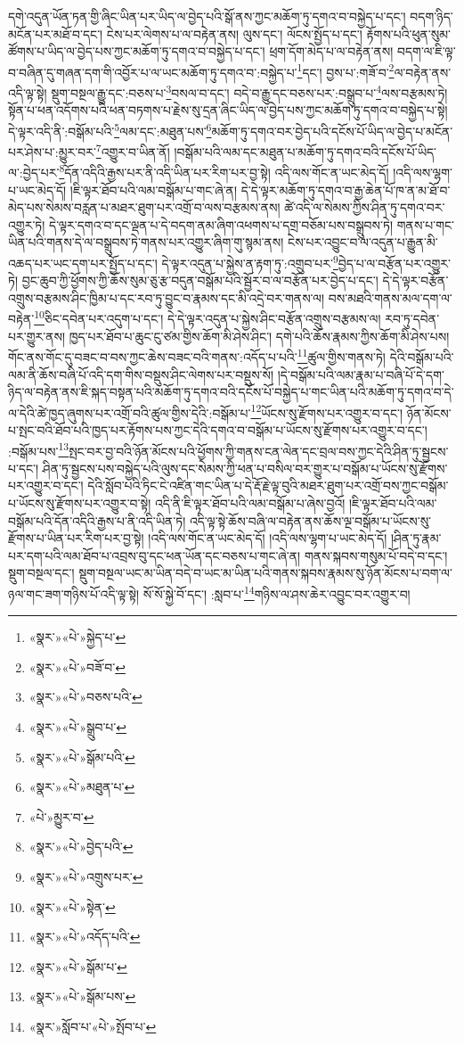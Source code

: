 དགེ་འདུན་ཡོན་ཏན་གྱི་ཞིང་ཡིན་པར་ཡིད་ལ་བྱེད་པའི་སྒོ་ནས་ཀྱང་མཆོག་ཏུ་དགའ་བ་བསྐྱེད་པ་དང་། བདག་ཉིད་མངོན་པར་མཐོ་བ་དང་། ངེས་པར་ལེགས་པ་ལ་བརྟེན་ནས། ལུས་དང་། ལོངས་སྤྱོད་པ་དང་། རྟོགས་པའི་ཕུན་སུམ་ཚོགས་པ་ཡིད་ལ་བྱེད་པས་ཀྱང་མཆོག་ཏུ་དགའ་བ་བསྐྱེད་པ་དང་། ཕྲག་དོག་མེད་པ་ལ་བརྟེན་ནས། བདག་ལ་ཇི་ལྟ་བ་བཞིན་དུ་གཞན་དག་གི་འབྱོར་པ་ལ་ཡང་མཆོག་ཏུ་དགའ་བ་:བསྐྱེད་པ་\footnote{«སྣར་»«པེ་»སྐྱེད་པ་}དང་། བྱས་པ་:གཟོ་བ་\footnote{«སྣར་»«པེ་»བཟོ་བ་}ལ་བརྟེན་ནས་འདི་ལྟ་སྟེ། སྡུག་བསྔལ་རྒྱུ་དང་:བཅས་པ་\footnote{«སྣར་»«པེ་»བཅས་པའི་}བསལ་བ་དང་། བདེ་བ་རྒྱུ་དང་བཅས་པར་:བསྒྲུབ་པ་\footnote{«སྣར་»«པེ་»སྒྲུབ་པ་}ལས་བརྩམས་ཏེ། སྟོན་པ་ཕན་འདོགས་པའི་ཕན་བཏགས་པ་རྗེས་སུ་དྲན་ཞིང་ཡིད་ལ་བྱེད་པས་ཀྱང་མཆོག་ཏུ་དགའ་བ་བསྐྱེད་པ་སྟེ། དེ་ལྟར་འདི་ནི་:བསྒོམ་པའི་\footnote{«སྣར་»«པེ་»སྒོམ་པའི་}ལམ་དང་:མཐུན་པས་\footnote{«སྣར་»«པེ་»མཐུན་པ་}མཆོག་ཏུ་དགའ་བར་བྱེད་པའི་དངོས་པོ་ཡིད་ལ་བྱེད་པ་མངོན་པར་ཤེས་པ་:མྱུར་བར་\footnote{«པེ་»མྱུར་བ་}འགྱུར་བ་ཡིན་ནོ། །བསྒོམ་པའི་ལམ་དང་མཐུན་པ་མཆོག་ཏུ་དགའ་བའི་དངོས་པོ་ཡིད་ལ་:བྱེད་པར་\footnote{«སྣར་»«པེ་»བྱེད་པའི་}དོན་འདིའི་རྒྱས་པར་ནི་འདི་ཡིན་པར་རིག་པར་བྱ་སྟེ། འདི་ལས་གོང་ན་ཡང་མེད་དོ། །འདི་ལས་ལྷག་པ་ཡང་མེད་དོ། །ཇི་ལྟར་ཐོབ་པའི་ལམ་བསྒོམ་པ་གང་ཞེ་ན། དེ་དེ་ལྟར་མཆོག་ཏུ་དགའ་བ་རྒྱ་ཆེན་པོ་ཁ་ན་མ་ཐོ་བ་མེད་པས་སེམས་བརླན་པ་མཐར་ཐུག་པར་འགྲོ་བ་ལས་བརྩམས་ནས། ཚེ་འདི་ལ་སེམས་ཀྱིས་ཤིན་ཏུ་དགའ་བར་འགྱུར་ཏེ། དེ་ལྟར་དགའ་བ་དང་ལྡན་པ་དེ་བདག་ནམ་ཞིག་འཕགས་པ་དགྲ་བཅོམ་པས་བསྒྲུབས་ཏེ། གནས་པ་གང་ཡིན་པའི་གནས་དེ་ལ་བསྒྲུབས་ཏེ་གནས་པར་འགྱུར་ཞིག་གུ་སྙམ་ནས། ངེས་པར་འབྱུང་བ་ལ་འདུན་པ་རྒྱུན་མི་འཆད་པར་ཡང་དག་པར་སྤྱོད་པ་དང་། དེ་ལྟར་འདུན་པ་སྐྱེས་ན་རྟག་ཏུ་:འགྲུབ་པར་\footnote{«སྣར་»«པེ་»འགྲུས་པར་}བྱེད་པ་ལ་བརྩོན་པར་འགྱུར་ཏེ། བྱང་ཆུབ་ཀྱི་ཕྱོགས་ཀྱི་ཆོས་སུམ་ཅུ་རྩ་བདུན་བསྒོམ་པའི་སྦྱོར་བ་ལ་བརྩོན་པར་བྱེད་པ་དང་། དེ་དེ་ལྟར་བརྩོན་འགྲུས་བརྩམས་ཤིང་ཁྱིམ་པ་དང་རབ་ཏུ་བྱུང་བ་རྣམས་དང་མི་འདྲེ་བར་གནས་ལ། བས་མཐའི་གནས་མལ་དག་ལ་བརྟེན་\footnote{«སྣར་»«པེ་»སྟེན་}ཅིང་དབེན་པར་འདུག་པ་དང་། དེ་དེ་ལྟར་འདུན་པ་སྐྱེས་ཤིང་བརྩོན་འགྲུས་བརྩམས་ལ། རབ་ཏུ་དབེན་པར་གྱུར་ནས། ཁྱད་པར་ཐོབ་པ་ཆུང་ངུ་ཙམ་གྱིས་ཆོག་མི་ཤེས་ཤིང་། དགེ་པའི་ཆོས་རྣམས་ཀྱིས་ཆོག་མི་ཤེས་པས། གོང་ནས་གོང་དུ་བཟང་བ་བས་ཀྱང་ཆེས་བཟང་བའི་གནས་:འདོད་པ་པའི་\footnote{«སྣར་»«པེ་»འདོད་པའི་}ཚུལ་གྱིས་གནས་ཏེ། དེའི་བསྒོམ་པའི་ལམ་ནི་ཆོས་བཞི་པོ་འདི་དག་གིས་བསྡུས་ཤིང་ལེགས་པར་བསྡུས་སོ། །དེ་བསྒོམ་པའི་ལམ་རྣམ་པ་བཞི་པོ་དེ་དག་ཉིད་ལ་བརྟེན་ནས་ཇི་སྐད་བསྟན་པའི་མཆོག་ཏུ་དགའ་བའི་དངོས་པོ་བསྐྱེད་པ་གང་ཡིན་པའི་མཆོག་ཏུ་དགའ་བ་དེ་ལ་དེའི་ཚེ་ཁྱད་ཞུགས་པར་འགྲོ་བའི་ཚུལ་གྱིས་དེའི་:བསྒོམ་པ་\footnote{«སྣར་»«པེ་»སྒོམ་པ་}ཡོངས་སུ་རྫོགས་པར་འགྱུར་བ་དང་། ཉོན་མོངས་པ་སྤང་བའི་ཐོབ་པའི་ཁྱད་པར་རྟོགས་པས་ཀྱང་དེའི་དགའ་བ་བསྒོམ་པ་ཡོངས་སུ་རྫོགས་པར་འགྱུར་བ་དང་། :བསྒོམ་པས་\footnote{«སྣར་»«པེ་»སྒོམ་པས་}སྤང་བར་བྱ་བའི་ཉོན་མོངས་པའི་ཕྱོགས་ཀྱི་གནས་ངན་ལེན་དང་བྲལ་བས་ཀྱང་དེའི་ཤིན་ཏུ་སྦྱངས་པ་དང་། ཤིན་ཏུ་སྦྱངས་པས་བསྐྱེད་པའི་ལུས་དང་སེམས་ཀྱི་ཕན་པ་བསིལ་བར་གྱུར་པ་བསྒོམ་པ་ཡོངས་སུ་རྫོགས་པར་འགྱུར་བ་དང་། དེའི་སློབ་པའི་ཏིང་ངེ་འཛིན་གང་ཡིན་པ་དེ་རྡོ་རྗེ་ལྟ་བུའི་མཐར་ཐུག་པར་འགྲོ་བས་ཀྱང་བསྒོམ་པ་ཡོངས་སུ་རྫོགས་པར་འགྱུར་བ་སྟེ། འདི་ནི་ཇི་ལྟར་ཐོབ་པའི་ལམ་བསྒོམ་པ་ཞེས་བྱའོ། །ཇི་ལྟར་ཐོབ་པའི་ལམ་བསྒོམ་པའི་དོན་འདིའི་རྒྱས་པ་ནི་འདི་ཡིན་ཏེ། འདི་ལྟ་སྟེ་ཆོས་བཞི་ལ་བརྟེན་ནས་ཆོས་ལྔ་བསྒོམ་པ་ཡོངས་སུ་རྫོགས་པ་ཡིན་པར་རིག་པར་བྱ་སྟེ། །འདི་ལས་གོང་ན་ཡང་མེད་དོ། །འདི་ལས་ལྷག་པ་ཡང་མེད་དོ། །ཤིན་ཏུ་རྣམ་པར་དག་པའི་ལམ་ཐོབ་པ་འབྲས་བུ་དང་ཕན་ཡོན་དང་བཅས་པ་གང་ཞེ་ན། གནས་སྐབས་གསུམ་པོ་བདེ་བ་དང་། སྡུག་བསྔལ་དང་། སྡུག་བསྔལ་ཡང་མ་ཡིན་བདེ་བ་ཡང་མ་ཡིན་པའི་གནས་སྐབས་རྣམས་སུ་ཉོན་མོངས་པ་བག་ལ་ཉལ་གང་ཟག་གཉིས་པོ་འདི་ལྟ་སྟེ། སོ་སོ་སྐྱེ་བོ་དང་། :སླབ་པ་\footnote{«སྣར་»སློབ་པ་«པེ་»སྤོབ་པ་}གཉིས་ལ་ཤས་ཆེར་འབྱུང་བར་འགྱུར་བ། 
